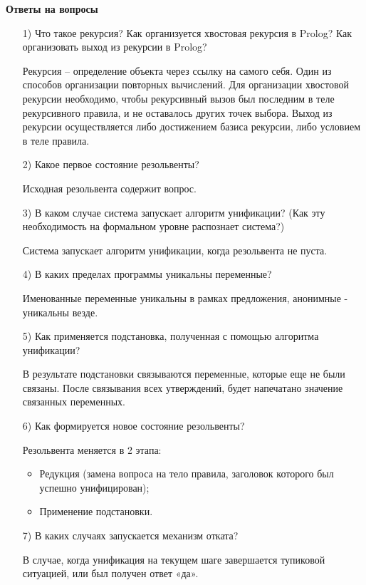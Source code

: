 \documentclass[12pt, a4paper]{extarticle}
\begin{document}
\textbf{Ответы на вопросы}
\begin{itemize}
	\item[1)] Что такое рекурсия? Как организуется хвостовая рекурсия в Prolog? Как организовать выход из рекурсии в Prolog?\par	
	Рекурсия – определение объекта через ссылку на самого себя. Один из
	способов организации повторных вычислений. Для организации хвостовой рекурсии необходимо, чтобы рекурсивный вызов был последним в теле рекурсивного правила, и не оставалось других точек выбора. Выход из рекурсии осуществляется либо достижением базиса рекурсии, либо условием в теле правила.
	
	\item[2)] Какое первое состояние резольвенты?\par
	Исходная резольвента содержит вопрос.
	
	\item[3)] В каком случае система запускает алгоритм унификации? (Как эту необходимость на формальном уровне распознает система?)\par
	
	Система запускает алгоритм унификации, когда резольвента не пуста.
	
	\item[4)] В каких пределах программы уникальны переменные?\par
	Именованные переменные уникальны в рамках предложения, анонимные - уникальны везде.
	
	\item[5)] Как применяется подстановка, полученная с помощью алгоритма
	унификации?\par	
	В результате подстановки связываются переменные, которые еще не были
	связаны. После связывания всех утверждений, будет напечатано значение
	связанных переменных.
	
	\item[6)] Как формируется новое состояние резольвенты?\par
	Резольвента меняется в 2 этапа:
	\begin{itemize}
		\item Редукция (замена вопроса на тело правила, заголовок которого был успешно унифицирован);
		\item Применение подстановки.
	\end{itemize}
	
	\item[7)] В каких случаях запускается механизм отката?\par
	В случае, когда унификация на текущем шаге завершается тупиковой
	ситуацией, или был получен ответ «да».
\end{itemize}
\end{document}
